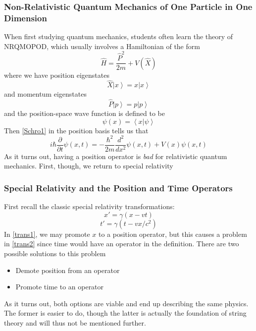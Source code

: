\documentclass[10pt]{article}
\newcommand{\ket}[1]{\left|#1\right>}
\newcommand{\ip}[2]{\left<#1|#2\right>}
\begin{document}
	\subsubsection{Non-Relativistic Quantum Mechanics of One Particle in One Dimension}
	When first studying quantum mechanics, students often learn the theory of NRQMOPOD, which usually involves a Hamiltonian of the form
	\begin{equation} \label{NRQMOPODHam} \hat{H} = \frac{\hat{P}^2}{2m}+V(\hat{X})\end{equation}
	where we have position eigenstates
	$$\hat{X}\ket{x} = x\ket{x}$$
	and momentum eigenstates
	$$\hat{P}\ket{p} = p\ket{p}$$
	and the position-space wave function is defined to be
	$$\psi(x) = \ip{x}{\psi}$$
	Then \eqref{Schro1} in the position basis tells us that
	$$i\hbar \frac{\partial}{\partial t} \psi(x,t) = -\frac{\hbar^2}{2m}\frac{d^2}{dx^2}\psi(x,t)+V(x)\psi(x,t)$$
		As it turns out, having a position operator is \emph{bad} for relativistic quantum mechanics. First, though, we return to special relativity
	\subsubsection{Special Relativity and the Position and Time Operators}
	First recall the classic special relativity transformations:
	\begin{equation}\label{trans1} x' = \gamma(x-vt) \end{equation}
	\begin{equation}\label{trans2} t' = \gamma(t-vx/c^2) \end{equation}
	In \eqref{trans1}, we may promote $x$ to a position operator, but this causes a problem in \eqref{trans2} since time would have an operator in the definition. There are two possible solutions to this problem
	\begin{itemize}
		\item Demote position from an operator
		\item Promote time to an operator
	\end{itemize}
	As it turns out, both options are viable and end up describing the same physics. The former is easier to do, though the latter is actually the foundation of string theory and will thus not be mentioned further.
\end{document}
